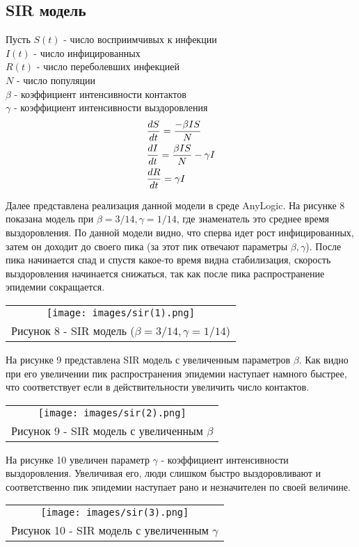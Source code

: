 \subsection{SIR модель}
Пусть $S(t)$ - число восприимчивых к инфекции\\
$I(t)$ - число инфицированных\\
$R(t)$ - число переболевших инфекцией\\
$N$ - число популяции\\
$\beta$ - коэффициент интенсивности контактов \\
$\gamma$ - коэффициент интенсивности выздоровления
\begin{align}
  &\dfrac{d S}{dt}=\dfrac{-\beta IS}{N}\notag\\
  &\dfrac{d I}{dt}=\dfrac{\beta IS}{N}-\gamma I\\
  &\dfrac{d R}{dt}=\gamma I\notag
\end{align}

Далее представлена реализация данной модели в среде AnyLogic. На рисунке 8 показана модель при $\beta=3/14,\gamma=1/14 $, где знаменатель это среднее время выздоровления. По данной модели видно, что сперва идет рост инфицированных, затем он доходит до своего пика (за этот пик отвечают параметры  $\beta,\gamma$). После пика начинается спад и спустя какое-то время видна стабилизация, скорость выздоровления начинается снижаться, так как после пика распространение эпидемии сокращается.
\begin{center}
  \begin{tabular}{c}
    \texttt{[image: images/sir(1).png]}\\
    Рисунок 8 - SIR модель ($\beta=3/14,\gamma=1/14 $)
  \end{tabular}
\end{center}

На рисунке 9 представлена SIR модель с увеличенным параметров $\beta$. Как видно при его увеличении пик распространения эпидемии наступает намного быстрее, что соответствует если в действительности увеличить число контактов.
\begin{center}
  \begin{tabular}{c}
    \texttt{[image: images/sir(2).png]}\\
    Рисунок 9 - SIR модель с увеличенным $\beta$
  \end{tabular}
\end{center}

На рисунке 10 увеличен параметр $\gamma$ - коэффициент интенсивности выздоровления. Увеличивая его, люди слишком быстро выздоровливают и соответственно пик эпидемии наступает рано и незначителен по своей величине.
\begin{center}
  \begin{tabular}{c}
    \texttt{[image: images/sir(3).png]}\\
    Рисунок 10 - SIR модель с увеличенным $\gamma$
  \end{tabular}
\end{center}

